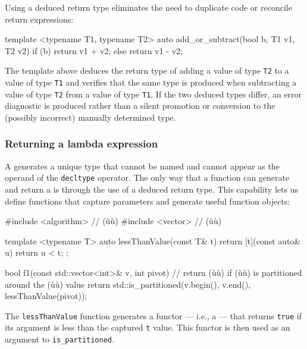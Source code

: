 Using a deduced return type eliminates the need to duplicate code or
reconcile return expressions:

\begin{emcppslisting}[emcppsstandards={c++14}]
template <typename T1, typename T2>
auto add_or_subtract(bool b, T1 v1, T2 v2)
{
    if (b) { return v1 + v2; }
    else   { return v1 - v2; }
}
\end{emcppslisting}
    

\noindent The template above deduces the return type of adding a value of type
\lstinline!T2! to a value of type \lstinline!T1! and verifies that the same
type is produced when subtracting a value of type \lstinline!T2! from a
value of type \lstinline!T1!. If the two deduced types differ, an error
diagnostic is produced rather than a silent promotion or conversion to
the (possibly incorrect) manually determined type.

\subsubsection[Returning a lambda expression]{Returning a lambda expression}\label{returning-a-lambda-expression}

A  generates a unique  type
that cannot be named and cannot appear as the operand of the
\lstinline!decltype! operator. The only way that a function can generate
and return a  is through the use of a deduced
return type. This capability lets us define functions that capture
parameters and generate useful function objects:

\begin{emcppslisting}[emcppsstandards={c++14}]
#include <algorithm>  // (ù{}ù)
#include <vector>     // (ù{}ù)

template <typename T>
auto lessThanValue(const T& t)
{
    return [t](const auto& u) { return u < t; };
}

bool f1(const std::vector<int>& v, int pivot)
    // return (ù{}ù) if (ù{}ù) is partitioned around the (ù{}ù) value
{
    return std::is_partitioned(v.begin(), v.end(), lessThanValue(pivot));
}
\end{emcppslisting}
    

\noindent The \lstinline!lessThanValue! function generates a functor --- i.e., a
 --- that returns \lstinline!true! if its argument
is less than the captured \lstinline!t! value. This functor is then used as
an argument to \lstinline!is_partitioned!.

